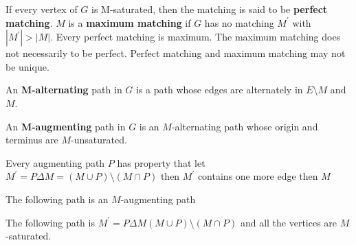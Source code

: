 			\begin{definition}
				If every vertex of $G$ is M-saturated, then the matching is said to be \textbf{perfect matching}. $M$ is a \textbf{maximum matching} if $G$ has no matching $M^\prime$ with $|M^\prime| > |M|$. Every perfect matching is maximum. The maximum matching does not necessarily to be perfect. Perfect matching and maximum matching may not be unique.
			\end{definition}

			\begin{definition}[M-alternating]
				An \textbf{M-alternating} path in $G$ is a path whose edges are alternately in $E\setminus M$ and $M$.
			\end{definition}

			\begin{definition}[M-augmenting]
				An \textbf{M-augmenting} path in $G$ is an $M$-alternating path whose origin and terminus are $M$-unsaturated.
			\end{definition}

			\begin{lemma}
				Every augmenting path $P$ has property that let $M^\prime = P\Delta M = (M \cup P) \setminus (M \cap P)$ then $M^\prime$ contains one more edge then $M$
			\end{lemma}

			The following path is an $M$-augmenting path
			\begin{figure}[!ht]
				\centering
			\end{figure}

			The following path is $M^\prime = P\Delta M (M \cup P) \setminus (M \cap P)$ and all the vertices are $M$-saturated.

			\begin{figure}[!ht]
				\centering
			\end{figure}

